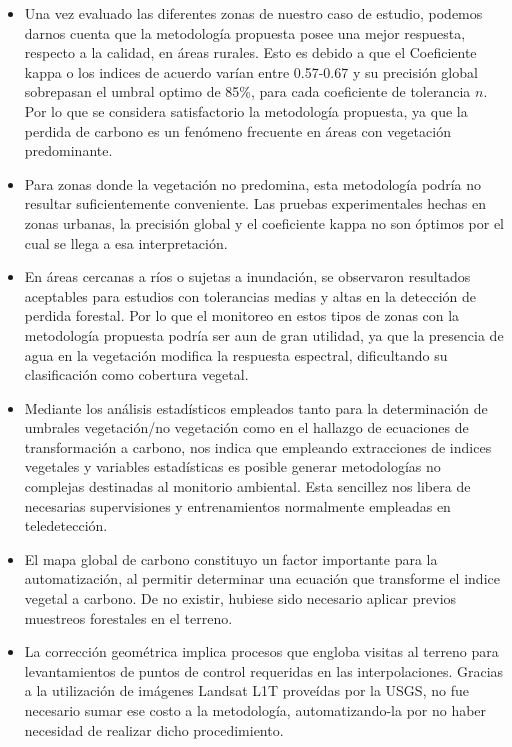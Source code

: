 \begin{itemize}
\item Una vez evaluado las diferentes zonas de nuestro caso de estudio, podemos darnos cuenta que la metodolog\'ia propuesta posee una mejor respuesta, respecto a la calidad, en \'areas rurales. Esto es debido a que el Coeficiente kappa o los indices de acuerdo var\'ian entre 0.57-0.67 y su precisi\'on global sobrepasan el umbral optimo de 85\%, para cada coeficiente de tolerancia $ n $. Por lo que se considera satisfactorio la metodolog\'ia propuesta, ya que la perdida de carbono es un fen\'omeno frecuente en \'areas con vegetaci\'on predominante.

\item Para zonas donde la vegetaci\'on no predomina, esta metodolog\'ia podr\'ia no resultar suficientemente conveniente. Las pruebas experimentales hechas en zonas urbanas, la precisi\'on global y el coeficiente kappa no son \'optimos por el cual se llega a esa interpretaci\'on.

\item En \'areas cercanas a r\'ios o sujetas a inundaci\'on, se observaron resultados aceptables para  estudios con tolerancias medias y altas en la detecci\'on de perdida forestal. Por lo que el monitoreo en estos tipos de zonas con la metodolog\'ia propuesta podr\'ia ser aun de gran utilidad, ya que la presencia de agua en la vegetaci\'on modifica la respuesta espectral, dificultando su clasificaci\'on como cobertura vegetal.

\item Mediante los an\'alisis estad\'isticos empleados tanto para la determinaci\'on de umbrales vegetaci\'on/no vegetaci\'on como en el hallazgo de ecuaciones de transformaci\'on a carbono, nos indica que empleando extracciones de indices vegetales y variables estad\'isticas es posible generar metodolog\'ias no complejas destinadas al monitorio ambiental. Esta sencillez nos libera de necesarias supervisiones y entrenamientos normalmente empleadas en teledetecci\'on.

\item El mapa global de carbono \cite{saatchi2011benchmark} constituyo un factor importante para la automatizaci\'on, al permitir determinar una ecuaci\'on que transforme el indice vegetal a carbono. De no existir, hubiese sido necesario aplicar previos muestreos forestales en el terreno.

\item La correcci\'on geom\'etrica implica procesos que engloba visitas al terreno para levantamientos de puntos de control requeridas en las interpolaciones. Gracias a la utilizaci\'on de im\'agenes Landsat L1T prove\'idas por la USGS, no fue necesario sumar ese costo a la metodolog\'ia, automatizando-la por no haber necesidad de realizar dicho procedimiento.

\end{itemize}

